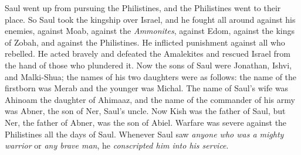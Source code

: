 \begin{biblechapter}
\verse Saul went up from pursuing the Philistines, and the Philistines went to their place.
\verse So Saul took the kingship over Israel, and he fought all around against his enemies, against Moab, against the \textit{Ammonites}, against Edom, against the kings of Zobah, and against the Philistines. He inflicted punishment against all who rebelled.
\verse He acted bravely and defeated the Amalekites and rescued Israel from the hand of those who plundered it.
\verse Now the sons of Saul were Jonathan, Ishvi, and Malki-Shua; the names of his two daughters were as follows: the name of the firstborn was Merab and the younger was Michal.
\verse The name of Saul’s wife was Ahinoam the daughter of Ahimaaz, and the name of the commander of his army was Abner, the son of Ner, Saul’s uncle.
\verse Now Kish was the father of Saul, but Ner, the father of Abner, was the son of Abiel.
\verse Warfare was severe against the Philistines all the days of Saul. Whenever Saul saw \textit{anyone who was a mighty warrior} or \textit{any brave man}, he \textit{conscripted him into his service}.
\end{biblechapter}

